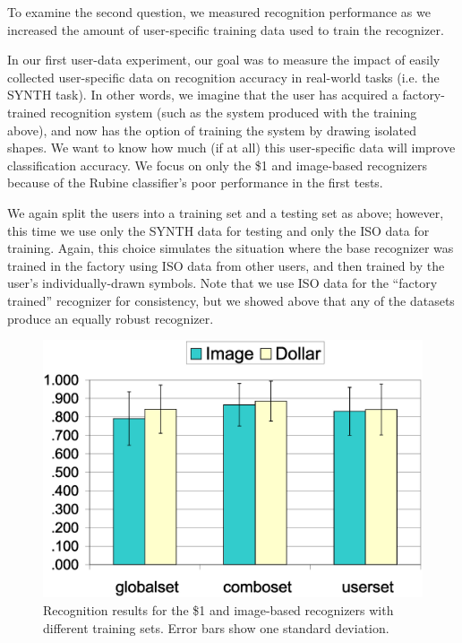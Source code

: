 \documentclass[final,5p,twocolumn]{elsarticle}
\begin{document}
To examine the second question, we measured recognition performance as
we increased the amount of user-specific training data used to train
the recognizer.

In our first user-data experiment, our goal was to measure the impact
of easily collected user-specific data on recognition accuracy in
real-world tasks (i.e. the SYNTH task).  In other words, we imagine
that the user has acquired a factory-trained recognition system (such
as the system produced with the training above), and now has the
option of training the system by drawing isolated shapes.  We want to
know how much (if at all) this user-specific data will improve
classification accuracy.  We focus on only the \$1 and image-based
recognizers because of the Rubine classifier's poor performance in the
first tests.

We again split the users into a training set and a testing set as
above; however, this time we use only the SYNTH data for testing and
only the ISO data for training.  Again, this choice simulates the
situation where the base recognizer was trained in the factory using
ISO data from other users, and then trained by the user's
individually-drawn symbols.  Note that we use ISO data for the
``factory trained'' recognizer for consistency, but we showed above
that any of the datasets produce an equally robust recognizer.

\begin{figure}
\includegraphics[width=1.0\hsize]{user_summary.eps}
\caption{Recognition results for the \$1 and image-based recognizers with different training sets. Error bars show one standard deviation.}
\label{usersGraph}
\end{figure}
\end{document}
